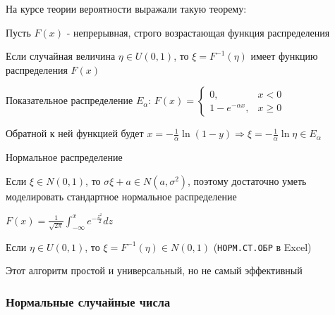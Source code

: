 \documentclass[12pt]{article}
\begin{document}
На курсе теории вероятности выражали такую теорему:

\begin{MyTheorem}
    \Ths Пусть $F(x)$ - непрерывная, строго возрастающая функция распределения

    Если случайная величина $\eta \in U(0, 1)$, то $\xi = F^{-1}(\eta)$ имеет функцию распределения $F(x)$
\end{MyTheorem}

\Ex Показательное распределение $E_\alpha$: $F(x) = \begin{cases}0, & x < 0 \\ 1 - e^{-\alpha x}, & x \geq 0\end{cases}$

Обратной к ней функцией будет $x = -\frac{1}{\alpha} \ln (1 - y) \Longrightarrow \xi = -\frac{1}{\alpha} \ln \eta \in E_\alpha$

\Ex Нормальное распределение

Если $\xi \in N(0, 1)$, то $\sigma \xi + a \in N(a, \sigma^2)$, поэтому достаточно уметь моделировать стандартное нормальное распределение

$F(x) = \frac{1}{\sqrt{2\pi}} \int_{-\infty}^x e^{-\frac{z^2}{2}} dz$

Если $\eta \in U(0, 1)$, то $\xi = F^{-1}(\eta) \in N(0, 1)$ (\texttt{НОРМ.СТ.ОБР} в Excel)

\Nota Этот алгоритм простой и универсальный, но не самый эффективный

\subsubsection{Нормальные случайные числа}
\end{document}
